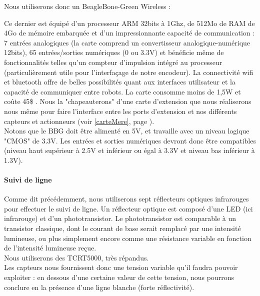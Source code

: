 			Nous utiliserons donc un BeagleBone-Green Wireless :

			Ce dernier est équipé d'un processeur ARM 32bits à 1Ghz, de 512Mo de RAM de 4Go de mémoire embarquée et d'un impressionnante capacité de communication : 7 entrées analogiques (la carte comprend un convertisseur analogique-numérique 12bits), 65 entrées/sorties numériques (0 ou 3.3V) et bénéficie même de fonctionnalités telles qu'un compteur d'impulsion intégré au processeur (particulièrement utile pour l'interfaçage de notre encodeur). La connectivité wifi et bluetooth offre de belles possibilités quant aux interfaces utilisateur et la capacité de communiquer entre robots. La carte consomme moins de 1,5W et coûte 45\$ \cite{bib6}.
			Nous la "chapeauterons" d'une carte d'extension que nous réaliserons nous même pour faire l'interface entre les ports d'extension et nos différents capteurs et actionneurs (voir \ref{carteMere}, page \pageref{carteMere}).\\

			Notons que le BBG doit être alimenté en 5V, et travaille avec un niveau logique "CMOS" de 3.3V. Les entrées et sorties numériques devront donc être compatibles (niveau haut supérieur à 2.5V et inférieur ou égal à 3.3V et niveau bas inférieur à 1.3V).

		\paragraph{Suivi de ligne}\label{solutionSuiviLigne}

			Comme dit précédemment, nous utiliserons sept réflecteurs optiques infrarouges pour effectuer le suivi de ligne.
			Un réflecteur optique est composé d'une LED  (ici infrarouge) et d'un phototransistor. Le phototransistor est comparable à un transistor classique, dont le courant de base serait remplacé par une intensité lumineuse, ou plus simplement encore comme une résistance variable en fonction de l'intensité lumineuse reçue.\\

			Nous utiliserons des TCRT5000, très répandus.\\

			Les capteurs nous fournissent donc une tension variable qu'il faudra pouvoir exploiter : en dessous d'une certaine valeur de cette tension, nous pourrons conclure en la présence d'une ligne blanche (forte réflectivité).\\

